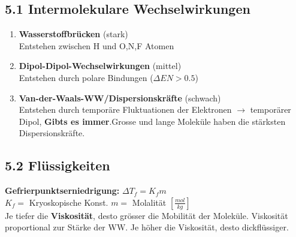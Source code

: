 \subsection{5.1 Intermolekulare Wechselwirkungen}
    \begin{enumerate}
        \item \textbf{Wasserstoffbrücken} (stark)\\
            Entstehen zwischen H und O,N,F Atomen
        \item \textbf{Dipol-Dipol-Wechselwirkungen} (mittel) \\
            Entstehen durch polare Bindungen ($\Delta EN>0.5$)
        \item \textbf{Van-der-Waals-WW/Dispersionskräfte} (schwach)\\
            Entstehen durch temporäre Fluktuationen der Elektronen $\rightarrow$ temporärer Dipol,
            \textbf{Gibts es immer}.Grosse und lange Moleküle haben die stärksten Dispersionskräfte.
    \end{enumerate}

\subsection{5.2 Flüssigkeiten}
    \textbf{Gefrierpunktserniedrigung: } $\Delta T_f=K_fm$\\
    $K_f=$ Kryoskopische Konst.     $m=$ Molalität $\left[\frac{mol}{kg}\right]$\\
    Je tiefer die \textbf{Viskosität}, desto grösser die Mobilität der Moleküle. Viskosität proportional
    zur Stärke der WW. Je höher die Viskosität, desto dickflüssiger. 


